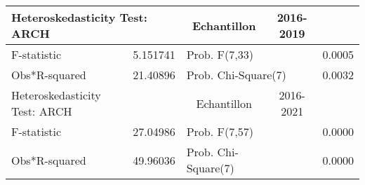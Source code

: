 \begin{tabular}{lrrrr}
\toprule
\multicolumn{2}{l}{Heteroskedasticity Test: ARCH}&\multicolumn{1}{c}{Echantillon}&\multicolumn{1}{c}{2016-2019}&\multicolumn{1}{c}{}\\
 \midrule
\multicolumn{1}{l}{F-statistic}&\multicolumn{1}{r}{5.151741}&\multicolumn{2}{l}{Prob. F(7,33)}&\multicolumn{1}{r}{0.0005}\\
\multicolumn{1}{l}{Obs*R-squared}&\multicolumn{1}{r}{21.40896}&\multicolumn{2}{l}{Prob. Chi-Square(7)}&\multicolumn{1}{r}{0.0032}\\
\toprule
\multicolumn{1}{l}{Heteroskedasticity Test: ARCH}&\multicolumn{1}{c}{}&\multicolumn{1}{c}{Echantillon}&\multicolumn{1}{c}{2016-2021}&\multicolumn{1}{c}{}\\
 \midrule
\multicolumn{1}{l}{F-statistic}&\multicolumn{1}{r}{27.04986}&\multicolumn{1}{l}{Prob. F(7,57)}&\multicolumn{1}{l}{}&\multicolumn{1}{c}{0.0000}\\
\multicolumn{1}{l}{Obs*R-squared}&\multicolumn{1}{r}{49.96036}&\multicolumn{1}{l}{Prob. Chi-Square(7)}&\multicolumn{1}{l}{}&\multicolumn{1}{c}{0.0000}\\
 \bottomrule
\end{tabular}
